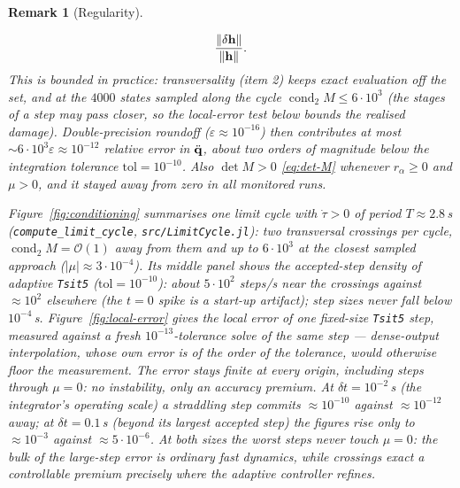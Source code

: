 \documentclass[10pt, a4paper]{article}
\newtheorem{remark}{Remark}
\begin{document}
\begin{remark}[Regularity]
\begin{enumerate}
\begin{equation*}
            \frac{\norm{\delta\vb h}}{\norm{\vb h}} .
        \end{equation*}
        This is bounded in practice: transversality (item 2) keeps exact
        evaluation off the set, and at the $4000$ states sampled along the
        cycle $\operatorname{cond}_2 M \le 6\cdot 10^3$ (the stages of a
        step may pass closer, so the local-error test below bounds the
        realised damage).  Double-precision roundoff
        ($\varepsilon \approx 10^{-16}$) then contributes at most
        $\sim 6\cdot 10^3\varepsilon \approx 10^{-12}$ relative error in
        $\ddot{\vb q}$, about two orders of magnitude below the integration
        tolerance $\mathrm{tol} = 10^{-10}$.  Also $\det M > 0$
        \eqref{eq:det-M} whenever $r_\alpha \ge 0$ and $\mu > 0$, and it
        stayed away from zero in all monitored runs.

        Figure~\ref{fig:conditioning} summarises one limit cycle with
        $\dot\tau > 0$ of period $T \approx 2.8$\,s
        (\texttt{compute\_limit\_cycle}, \texttt{src/LimitCycle.jl}):
        two transversal crossings per cycle, $\operatorname{cond}_2 M =
        \mathcal{O}(1)$ away from them and up to $6\cdot 10^3$ at the
        closest sampled approach ($\lvert\mu\rvert \approx 3\cdot 10^{-4}$).
        Its middle panel shows the accepted-step density of adaptive
        \texttt{Tsit5} ($\mathrm{tol} = 10^{-10}$): about $5\cdot 10^2$
        steps/s near the crossings against $\approx 10^2$ elsewhere (the
        $t = 0$ spike is a start-up artifact); step sizes never fall below
        $10^{-4}$\,s.  Figure~\ref{fig:local-error} gives the local error
        of one fixed-size \texttt{Tsit5} step, measured against a fresh
        $10^{-13}$-tolerance solve of the same step --- dense-output
        interpolation, whose own error is of the order of the tolerance,
        would otherwise floor the measurement.  The error stays finite at
        every origin, including steps through $\mu = 0$: no instability,
        only an accuracy premium.  At $\delta t = 10^{-2}$\,s (the
        integrator's operating scale) a straddling step commits
        $\approx 10^{-10}$ against $\approx 10^{-12}$ away; at
        $\delta t = 0.1$\,s (beyond its largest accepted step) the figures
        rise only to $\approx 10^{-3}$ against $\approx 5\cdot 10^{-6}$.
        At both sizes the worst steps never touch $\mu = 0$: the bulk of
        the large-step error is ordinary fast dynamics, while crossings
        exact a controllable premium precisely where the adaptive
        controller refines.
    \end{enumerate}
\end{remark}
\end{document}
